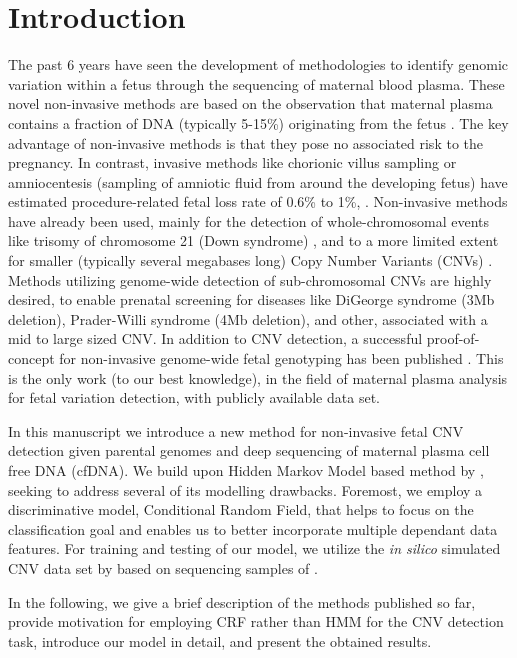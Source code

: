 \section{Introduction}

The past 6 years have seen the development of methodologies to identify genomic variation within a fetus through the sequencing of maternal blood plasma. These novel non-invasive methods are based on the observation that maternal plasma contains a fraction of DNA (typically 5-15\%) originating from the fetus \citep{lo1997presence}. The key advantage of non-invasive methods is that they pose no associated risk to the pregnancy. In contrast, invasive methods like chorionic villus sampling or amniocentesis (sampling of amniotic fluid from around the developing fetus) have estimated procedure-related fetal loss rate of 0.6\% to 1\%, \cite{douglas2007amnio}. Non-invasive methods have already been used, mainly for the detection of whole-chromosomal events like trisomy of chromosome 21 (Down syndrome) \citep{chiu2008noninvasive, fan2008noninvasive}, and to a more limited extent for smaller (typically several megabases long) Copy Number Variants (CNVs) \citep{chen2013, srinivasan2013, rampasek2014fcnv}. Methods utilizing genome-wide detection of sub-chromosomal CNVs are highly desired, to enable prenatal screening for diseases like DiGeorge syndrome (\ntilde3Mb deletion), Prader-Willi syndrome (\ntilde4Mb deletion), and other, associated with a mid to large sized CNV. In addition to CNV detection, a successful proof-of-concept for non-invasive genome-wide fetal genotyping has been published \citep{kitzman2012}. This is the only work (to our best knowledge), in the field of maternal plasma analysis for fetal variation detection, with publicly available data set.

In this manuscript we introduce a new method for non-invasive fetal CNV detection given parental genomes and deep sequencing of maternal plasma cell free DNA (cfDNA). We build upon Hidden Markov Model based method by \cite{rampasek2014fcnv}, seeking to address several of its modelling drawbacks. Foremost, we employ a discriminative model, Conditional Random Field, that helps to focus on the classification goal and enables us to better incorporate multiple dependant data features. For training and testing of our model, we utilize the \textit{in silico} simulated CNV data set by \cite{rampasek2014fcnv} based on sequencing samples of \cite{kitzman2012}.

In the following, we give a brief description of the methods published so far, provide motivation for employing CRF rather than HMM for the CNV detection task, introduce our model in detail, and present the obtained results.

